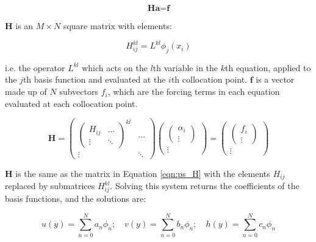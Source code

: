 \begin{equation}
  \textbf{H} \textbf{a} = \textbf{f}
\end{equation}

$\textbf{H}$ is an $M \times N$ square matrix with elements:

\begin{equation}
  H^{kl}_{ij} = L^{kl}\phi_{j}(x_{i})
\end{equation}

i.e. the operator $L^{kl}$ which acts on the $l$th variable in the $k$th equation, applied to the $j$th basis function and evaluated at the $i$th collocation point. $\textbf{f}$ is a vector made up of $N$ subvectors $f_{i}$, which are the forcing terms in each equation evaluated at each collocation point.

\begin{equation}
    \textbf{H} =
  \begin{pmatrix}
    \begin{pmatrix}
H_{ij} & \dots \\
\vdots & \ddots
    \end{pmatrix}^{kl} & \dots \\
  \vdots & \ddots
  \end{pmatrix}
  \begin{pmatrix}
    \begin{pmatrix}
    \alpha_{i} \\
    \vdots
    \end{pmatrix} \\
  \vdots
  \end{pmatrix}
  =
  \begin{pmatrix}
    \begin{pmatrix}
    f_{i} \\
    \vdots
    \end{pmatrix} \\
  \vdots
  \end{pmatrix}
\end{equation}

$\textbf{H}$ is the same as the matrix in Equation \ref{eqn:ps_H} with the elements $H_{ij}$ replaced by submatrices $H^{kl}_{ij}$. Solving this system returns the coefficients of the basis functions, and the solutions are:

\begin{equation}\label{eqn:ps-coeff-solutions}
 u(y) = \sum_{n=0}^{N} a_{n} \phi_{n}
; \quad
 v(y) = \sum_{n=0}^{N} b_{n} \phi_{n}
; \quad
 h(y) = \sum_{n=0}^{N} c_{n} \phi_{n}
\end{equation}



